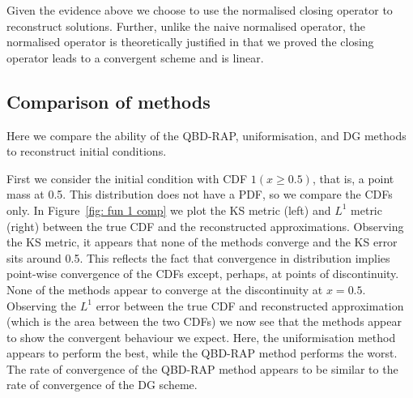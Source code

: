 Given the evidence above we choose to use the normalised closing operator to reconstruct solutions. Further, unlike the naive normalised operator, the normalised operator is theoretically justified in that we proved the closing operator leads to a convergent scheme and is linear. 

\FloatBarrier
\subsection{Comparison of methods}\label{sec: comp}
Here we compare the ability of the QBD-RAP, uniformisation, and DG methods to reconstruct initial conditions. 

\begin{example}First we consider the initial condition with CDF \(1(x\geq 0.5)\), that is, a point mass at 0.5. This distribution does not have a PDF, so we compare the CDFs only. In Figure~\ref{fig: fun 1 comp} we plot the KS metric (left) and \(L^1\) metric (right) between the true CDF and the reconstructed approximations. Observing the KS metric, it appears that none of the methods converge and the KS error sits around 0.5. This reflects the fact that convergence in distribution implies point-wise convergence of the CDFs except, perhaps, at points of discontinuity. None of the methods appear to converge at the discontinuity at \(x=0.5\). Observing the \(L^1\) error between the true CDF and reconstructed approximation (which is the area between the two CDFs) we now see that the methods appear to show the convergent behaviour we expect. Here, the uniformisation method appears to perform the best, while the QBD-RAP method performs the worst. The rate of convergence of the QBD-RAP method appears to be similar to the rate of convergence of the DG scheme. 


\end{example}
